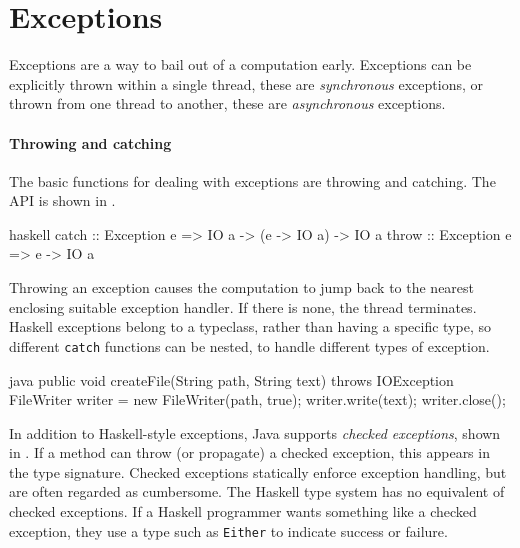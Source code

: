 \section{Exceptions}
\label{sec:concurrent_haskell-exc}

Exceptions are a way to bail out of a computation early.  Exceptions can be
explicitly thrown within a single thread, these are \emph{synchronous}
exceptions, or thrown from one thread to another, these are \emph{asynchronous}
exceptions.

\paragraph{Throwing and catching}
The basic functions for dealing with exceptions are throwing and
catching.  The API is shown in .

\begin{listing}
\centering
\begin{cminted}{haskell}
catch :: Exception e => IO a -> (e -> IO a) -> IO a
throw :: Exception e => e -> IO a
\end{cminted}
\caption{Exceptions in Haskell.}\label{lst:excs_haskell}
\end{listing}

Throwing an exception causes the computation to jump back to the
nearest enclosing suitable exception handler.  If there is none, the
thread terminates.  Haskell exceptions belong to a typeclass, rather
than having a specific type, so different \verb|catch| functions can
be nested, to handle different types of exception.

\begin{listing}
\centering
\begin{cminted}{java}
public void createFile(String path, String text) throws IOException {
  FileWriter writer = new FileWriter(path, true);
  writer.write(text);
  writer.close();
}
\end{cminted}
\caption{Checked exceptions in Java.}\label{lst:excs_java}
\end{listing}

In addition to Haskell-style exceptions, Java supports \emph{checked
  exceptions}, shown in .  If a method can throw
(or propagate) a checked exception, this appears in the type
signature.  Checked exceptions statically enforce exception handling,
but are often regarded as cumbersome.  The Haskell type system has no
equivalent of checked exceptions.  If a Haskell programmer wants
something like a checked exception, they use a type such as
\verb|Either| to indicate success or failure.

